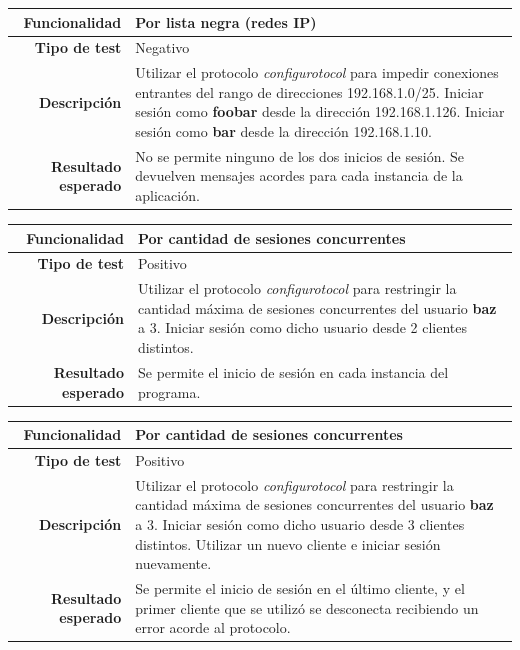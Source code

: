 \documentclass[a4paper,10pt]{article}
\begin{document}
\begin{center}
  \begin{tabular}{|r|p{12.5cm}|}
    \hline
    \textbf{Funcionalidad}	&	Por lista negra (redes IP)\\
    \hline
    \textbf{Tipo de test}	&	Negativo\\
    \hline
    \textbf{Descripción}	&	Utilizar el protocolo \textit{configurotocol} para impedir conexiones
					entrantes del rango de direcciones 192.168.1.0/25. Iniciar sesión como
					\textbf{foobar} desde la dirección 192.168.1.126. Iniciar sesión como
					\textbf{bar} desde la dirección 192.168.1.10.\\
    \hline
    \textbf{Resultado esperado}	&	No se permite ninguno de los dos inicios de sesión. Se devuelven mensajes
					acordes para cada instancia de la aplicación.\\
    \hline   
  \end{tabular}
\end{center}

\begin{center}
  \begin{tabular}{|r|p{12.5cm}|}
    \hline
    \textbf{Funcionalidad}	&	Por cantidad de sesiones concurrentes\\
    \hline
    \textbf{Tipo de test}	&	Positivo\\
    \hline
    \textbf{Descripción}	&	Utilizar el protocolo \textit{configurotocol} para restringir la cantidad
					máxima de sesiones concurrentes del usuario \textbf{baz} a 3.
					Iniciar sesión como dicho usuario desde 2 clientes distintos.\\
    \hline
    \textbf{Resultado esperado}	&	Se permite el inicio de sesión en cada instancia del programa.\\
    \hline   
  \end{tabular}
\end{center}

\begin{center}
  \begin{tabular}{|r|p{12.5cm}|}
    \hline
    \textbf{Funcionalidad}	&	Por cantidad de sesiones concurrentes\\
    \hline
    \textbf{Tipo de test}	&	Positivo\\
    \hline
    \textbf{Descripción}	&	Utilizar el protocolo \textit{configurotocol} para restringir la cantidad
					máxima de sesiones concurrentes del usuario \textbf{baz} a 3.
					Iniciar sesión como dicho usuario desde 3 clientes
					distintos. Utilizar un nuevo cliente e iniciar sesión nuevamente.\\
    \hline
    \textbf{Resultado esperado}	&	Se permite el inicio de sesión en el último cliente, y el primer cliente
					que se utilizó se desconecta recibiendo un error acorde al protocolo.\\
    \hline   
  \end{tabular}
\end{center}
\end{document}
